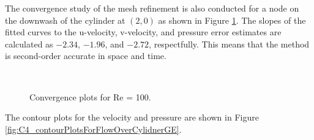%
The convergence study of the mesh refinement is also conducted for a node on the downwash of the cylinder at $(2, 0)$ as shown in Figure \ref{fig:C4_meshRefinementForCylinderRE100GE}. The slopes of the fitted curves to the u-velocity, v-velocity, and pressure error estimates are calculated as $-2.34$, $-1.96$, and $-2.72$, respectfully. This means that the method is second-order accurate in space and time.
%
\begin{figure}[H]
    \centering
    \quad
    \\
    \caption{Convergence plots for Re = 100.}
    \label{fig:C4_meshRefinementForCylinderRE100GE}
\end{figure}
%
The contour plots for the velocity and pressure are shown in Figure \ref{fig:C4_contourPlotsForFlowOverCylidnerGE}.
%
